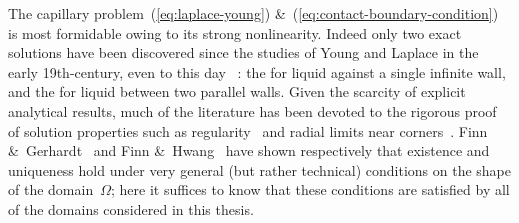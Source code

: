 The capillary problem~(\ref{eq:laplace-young})
\&~(\ref{eq:contact-boundary-condition})
is most formidable owing to its strong nonlinearity.
Indeed only two exact solutions have been discovered
since the studies of Young and Laplace
in the early 19th-century,
even to this day~%
  \cite{anderson-2006-exact-solutions-laplace-young}:
the  for liquid against a single infinite wall,
and the  for liquid between two parallel walls.
Given the scarcity of explicit analytical results,
much of the literature has been devoted
to the rigorous proof of solution properties
such as
regularity~\cite{
  gerhardt-1976-global-regularity-solutions-capillarity,
  gerhardt-1980-free-bvp-capillary-surfaces,
  simon-1980-regularity-capillary-surfaces-corners,
  tam-1986-regularity-capillary-corners-borderline
}
and
radial limits near corners~\cite{
  crenshaw-2018-generalization-radial-limits-bounded,
  entekhabi-2017-radial-limits-capillary-corners,
  lancaster-1996-bounded-h-re-entrant,
  lancaster-1996-radial-limits-bounded-capillary,
  lancaster-1997-correction-radial-limits-bounded,
  lancaster-2012-remarks-nonparametric-capillary-corners
}.
Finn \&~Gerhardt~\cite{finn-1977-internal-sphere-condition-capillary}
and Finn \&~Hwang~\cite{finn-1989-comparison-principle-capillary-surfaces}
have shown respectively that existence and uniqueness hold
under very general (but rather technical) conditions
on the shape of the domain~$\Omega$;
here it suffices to know that these conditions are satisfied
by all of the domains considered in this thesis.

